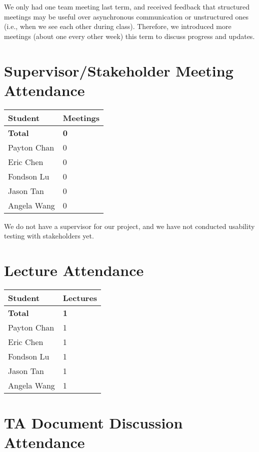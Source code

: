 \documentclass{article}
\begin{document}
We only had one team meeting last term, and received feedback that structured
meetings may be useful over asynchronous communication or unstructured ones
(i.e., when we see each other during class). Therefore, we introduced more
meetings (about one every other week) this term to discuss progress and updates.

\section{Supervisor/Stakeholder Meeting Attendance}

\begin{table}[H]
    \centering
    \begin{tabular}{ll}
    \toprule
    \textbf{Student} & \textbf{Meetings}\\
    \midrule
    \textbf{Total} & \textbf{0}\\
    Payton Chan & 0\\
    Eric Chen & 0\\
    Fondson Lu & 0\\
    Jason Tan & 0\\
    Angela Wang & 0\\
    \bottomrule
    \end{tabular}
    \end{table}
    
We do not have a supervisor for our project, and we have not conducted usability
testing with stakeholders yet.

\section{Lecture Attendance}

\begin{table}[H]
    \centering
    \begin{tabular}{ll}
    \toprule
    \textbf{Student} & \textbf{Lectures}\\
    \midrule
    \textbf{Total} & \textbf{1}\\
    Payton Chan & 1\\
    Eric Chen & 1\\
    Fondson Lu & 1\\
    Jason Tan & 1\\
    Angela Wang & 1\\
    \bottomrule
    \end{tabular}
\end{table}

\section{TA Document Discussion Attendance}
\end{document}
